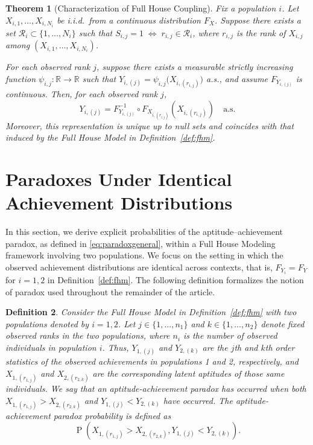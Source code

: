 \documentclass[12pt]{article}
\DeclareMathOperator*{\Prob}{P}
\newtheorem{theorem}{Theorem}[section]
\newtheorem{defn}[theorem]{Definition}
\begin{document}
\begin{theorem}[Characterization of Full House Coupling]
\label{thm:FHM-characterization-clean}
Fix a population $i$. Let $X_{i,1},\dots,X_{i,N_i}$ be i.i.d.\ from a continuous distribution $F_X$. Suppose there exists a set $\mathcal{R}_i \subset \{1,\dots,N_i\}$ such that $S_{i,j} = 1 \;\Longleftrightarrow\; r_{i,j} \in \mathcal{R}_i$, where $r_{i,j}$ is the rank of $X_{i,j}$ among $(X_{i,1},\dots,X_{i,N_i})$. 

For each observed rank $j$, suppose there exists a measurable strictly increasing function $\psi_{i,j}:\mathbb{R}\to\mathbb{R}$ such that $Y_{i,(j)} = \psi_{i,j}\!\big(X_{i,(r_{i,j})}\big)$ a.s., and assume $F_{Y_{i,(j)}}$ is continuous. Then, for each observed rank $j$,
$$
Y_{i,(j)} = F_{Y_{i,(j)}}^{-1} \circ F_{X_{i,(r_{i,j})}}\!\left(X_{i,(r_{i,j})}\right)
\quad \text{a.s.}
$$
Moreover, this representation is unique up to null sets and coincides with that induced by the Full House Model in Definition~\ref{def:fhm}.
\end{theorem}


\section{Paradoxes Under Identical Achievement Distributions}
\label{sec:samedist}

In this section, we derive explicit probabilities of the aptitude--achievement paradox, as defined in \eqref{eq:paradoxgeneral}, within a Full House Modeling framework involving two populations. We focus on the setting in which the observed achievement distributions are identical across contexts, that is, $F_{Y_i} = F_Y$ for $i = 1,2$ in Definition~\ref{def:fhm}. The following definition formalizes the notion of paradox used throughout the remainder of the article.

\begin{defn}\label{def:paradox}
Consider the Full House Model in Definition~\ref{def:fhm} with two populations denoted by $i=1,2$. Let $j\in\{1,\dots,n_1\}$ and $k\in\{1,\dots,n_2\}$ denote fixed observed ranks in the two populations, where $n_i$ is the number of observed individuals in population $i$. Thus, $Y_{1,(j)}$ and $Y_{2,(k)}$ are the $j$th and $k$th order statistics of the observed achievements in populations 1 and 2, respectively, and $X_{1,(r_{1,j})}$ and $X_{2,(r_{2,k})}$ are the corresponding latent aptitudes of those same individuals. We say that an aptitude-achievement paradox has occurred when both $X_{1,(r_{1,j})} > X_{2,(r_{2,k})}$ and  $Y_{1,(j)} < Y_{2,(k)}$ have occurred. The aptitude-achievement paradox probability is defined as
\begin{equation} \label{eq:simpleparadox}
  \Prob\left(X_{1,(r_{1,j})} > X_{2,(r_{2,k})}, Y_{1,(j)} < Y_{2,(k)}\right).
\end{equation}	
\end{defn}
\end{document}
